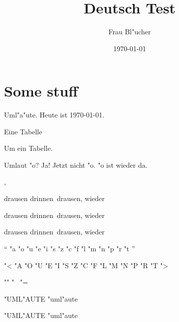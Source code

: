 \documentclass{report}
\begin{document}
\title{Deutsch Test}
\author{Frau Bl"ucher}
\date{\today}
\maketitle
\chapter{Some stuff}
Uml"a"ute.  Heute ist \today.
\begin{table}
Eine Tabelle
\caption{Um ein Tabelle.}
\end{table}

Umlaut "o? Ja! \mdqoff Jetzt nicht "o. \mdqon "o ist wieder da.


\dj \DJ, \ij \IJ

\flqq drausen \flq drinnen\frq\ drausen, wieder\frqq

\glqq drausen \glq drinnen\grq\ drausen, wieder\grqq

\guillemotleft drausen \guilsinglleft drinnen\guilsinglright\ drausen, wieder\guillemotright

 "` "a "o "u "e "i "s "z "c "f "l "m "n "p "r "t  "'

"< "A "O "U "E "I "S "Z "C "F "L "M "N "P "R "T  "> 

"" "~ "=

\uppercase{"uml"aute}
\lowercase{"UML"AUTE}


\MakeUppercase{"uml"aute}
\MakeLowercase{"UML"AUTE}
\end{document}
